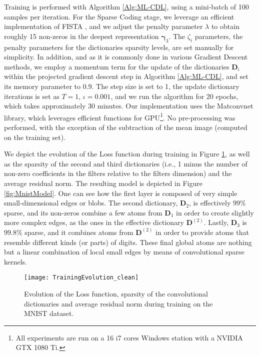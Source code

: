 \documentclass[10pt,journal]{IEEEtran}
\def\D{{\mathbf D}}
\def\gama{{\boldsymbol \gamma}}
\theoremstyle{plain}
\theoremstyle{definition}
\begin{document}
Training is performed with Algorithm \ref{Alg:ML-CDL}, using a mini-batch of 100 samples per iteration. For the Sparse Coding stage, we leverage an efficient implementation of FISTA \cite{beck2009fast}, and we adjust the penalty parameter $\lambda$ to obtain roughly 15 non-zeros in the deepest representation $\gama_3$. The $\zeta_i$ parameters, the penalty parameters for the dictionaries sparsity levels, are set manually for simplicity. In addition, and as it is commonly done in various Gradient Descent methods, we employ a momentum term for the update of the dictionaries $\D_i$ within the projected gradient descent step in Algorithm \ref{Alg:ML-CDL}, and set its memory parameter to 0.9. The step size is set to 1, the update dictionary iterations is set as $T=1$, $\iota = 0.001$, and we run the algorithm for 20 epochs, which takes approximately 30 minutes. Our implementation uses the Matconvnet library, which leverages efficient functions for GPU\footnote{All experiments are run on a 16 i7 cores Windows station with a NVIDIA GTX 1080 Ti.}. No pre-processing was performed, with the exception of the subtraction of the mean image (computed on the training set).

We depict the evolution of the Loss function during training in Figure \ref{fig:Training}, as well as the sparsity of the second and third dictionaries (i.e., 1 minus the number of non-zero coefficients in the filters relative to the filters dimension) and the average residual norm. The resulting model is depicted in Figure \ref{fig:MnistModel}. One can see how the first layer is composed of very simple small-dimensional edges or blobs. The second dictionary, $\D_2$, is effectively $99\%$ sparse, and its non-zeros combine a few atoms from $\D_1$ in order to create slightly more complex edges, as the ones in the effective dictionary $\D^{(2)}$. Lastly, $\D_3$ is $99.8\%$ sparse, and it combines atoms from $\D^{(2)}$ in order to provide atoms that resemble different kinds (or parts) of digits. These final global atoms are nothing but a linear combination of local small edges by means of convolutional sparse kernels. 


\begin{figure}
\begin{center}
		\texttt{[image: TrainingEvolution\_clean]}
\caption{Evolution of the Loss function, sparsity of the convolutional dictionaries and average residual norm during training on the MNIST dataset.}
\label{fig:Training}
\end{center}
\end{figure}
\end{document}
